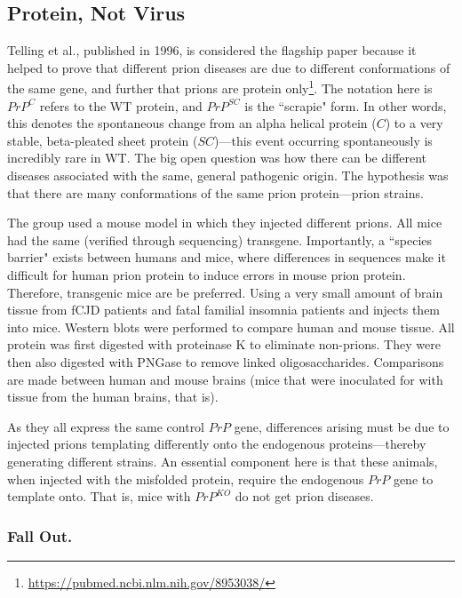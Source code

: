 \subsection*{Protein, Not Virus}

Telling et al., published in 1996, is considered the flagship paper because it helped to prove that different prion diseases are due to different conformations of the same gene, and further that prions are protein only\footnote{\url{https://pubmed.ncbi.nlm.nih.gov/8953038/}}. The notation here is $PrP^C$ refers to the WT protein, and $PrP^{SC}$ is the ``scrapie" form. In other words, this denotes the spontaneous change from an alpha helical protein ($C$) to a very stable, beta-pleated sheet protein ($SC$)---this event occurring spontaneously is incredibly rare in WT. The big open question was how there can be different diseases associated with the same, general pathogenic origin. The hypothesis was that there are many conformations of the same prion protein---prion strains.\newline 

The group used a mouse model in which they injected different prions. All mice had the same (verified through sequencing) transgene.  Importantly, a ``species barrier" exists between humans and mice, where differences in sequences make it difficult for human prion protein to induce errors in mouse prion protein. Therefore, transgenic mice are be preferred. Using a very small amount of brain tissue from fCJD patients and fatal familial insomnia patients and injects them into mice. Western blots were performed to compare human and mouse tissue. All protein was first digested with proteinase K to eliminate non-prions. They were then also digested with PNGase to remove linked oligosaccharides. Comparisons are made between human and mouse brains (mice that were inoculated for with tissue from the human brains, that is).\newline

As they all express the same control $PrP$ gene, differences arising must be due to injected prions templating differently onto the endogenous proteins---thereby generating different strains. An essential component here is that these animals, when injected with the misfolded protein, require the endogenous $PrP$ gene to template onto. That is, mice with $PrP^{KO}$ do not get prion diseases.

\subsubsection*{Fall Out.}

